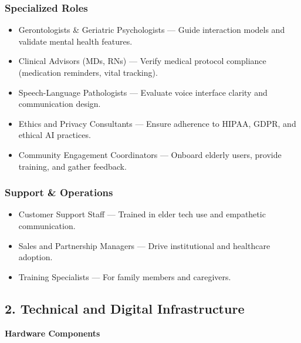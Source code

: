 \documentclass[
  letterpaper,
  DIV=11,
  numbers=noendperiod]{scrartcl}
\providecommand{\tightlist}{%
  \setlength{\itemsep}{0pt}\setlength{\parskip}{0pt}}\usepackage{longtable,booktabs,array}
\begin{document}
\subsubsection{Specialized Roles}\label{specialized-roles}

\begin{itemize}
\tightlist
\item
  Gerontologists \& Geriatric Psychologists --- Guide interaction models
  and validate mental health features.
\item
  Clinical Advisors (MDs, RNs) --- Verify medical protocol compliance
  (medication reminders, vital tracking).
\item
  Speech-Language Pathologists --- Evaluate voice interface clarity and
  communication design.
\item
  Ethics and Privacy Consultants --- Ensure adherence to HIPAA, GDPR,
  and ethical AI practices.
\item
  Community Engagement Coordinators --- Onboard elderly users, provide
  training, and gather feedback.
\end{itemize}

\subsubsection{Support \& Operations}\label{support-operations}

\begin{itemize}
\tightlist
\item
  Customer Support Staff --- Trained in elder tech use and empathetic
  communication.
\item
  Sales and Partnership Managers --- Drive institutional and healthcare
  adoption.
\item
  Training Specialists --- For family members and caregivers.
\end{itemize}

\subsection{2. Technical and Digital
Infrastructure}\label{technical-and-digital-infrastructure}

\textbf{Hardware Components}
\end{document}
